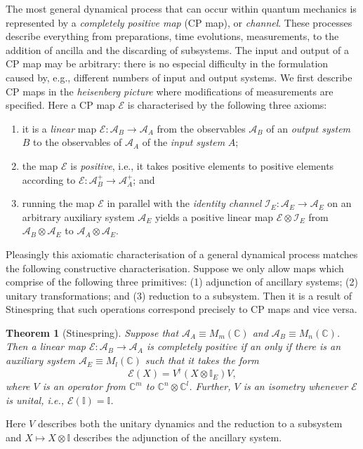 \documentclass[11pt]{amsart}
\theoremstyle{plain}%
\newtheorem{theorem}{Theorem}[section]
\theoremstyle{definition}
\theoremstyle{remark}
\begin{document}
The most general dynamical process that can occur within quantum mechanics is represented by a \emph{completely positive map} (CP map), or \emph{channel}. These processes describe everything from preparations, time evolutions, measurements, to the addition of ancilla and the discarding of subsystems. The input and output of a CP map may be arbitrary: there is no especial difficulty in the formulation caused by, e.g., different numbers of input and output systems. We first describe CP maps in the \emph{heisenberg picture} where modifications of measurements are specified. Here a CP map $\mathcal{E}$ is characterised by the following three axioms: 
\begin{enumerate}
	\item it is a \emph{linear} map $\mathcal{E}:\mathcal{A}_B\rightarrow \mathcal{A}_A$ from the observables $\mathcal{A}_B$ of an \emph{output system} $B$ to the observables of $\mathcal{A}_A$ of the  \emph{input system} $A$;
	\item the map $\mathcal{E}$ is \emph{positive}, i.e., it takes positive elements to positive elements according to $\mathcal{E}:\mathcal{A}_B^+\rightarrow \mathcal{A}_A^+$; and 
	\item running the map $\mathcal{E}$ in parallel with the \emph{identity channel} $\mathcal{I}_E : \mathcal{A}_E\rightarrow \mathcal{A}_E$ on an arbitrary auxiliary system $\mathcal{A}_E$ yields a positive linear map $\mathcal{E}\otimes \mathcal{I}_E$ from $\mathcal{A}_B\otimes \mathcal{A}_E$ to $\mathcal{A}_A\otimes \mathcal{A}_E$.
\end{enumerate} 
Pleasingly this axiomatic characterisation of a general dynamical process matches the following constructive characterisation. Suppose we only allow maps which comprise of the following three primitives: (1) adjunction of  ancillary systems; (2) unitary transformations; and (3) reduction to a subsystem. Then it is a result of Stinespring that such operations correspond precisely to CP maps and vice versa. 
\begin{theorem}[Stinespring] Suppose that $\mathcal{A}_A \equiv M_m(\mathbb{C})$ and $\mathcal{A}_B \equiv M_n(\mathbb{C})$. Then a linear map $\mathcal{E}:\mathcal{A}_B\rightarrow \mathcal{A}_A$ is completely positive if an only if there is an auxiliary system $\mathcal{A}_E \equiv M_l(\mathbb{C})$ such that it takes the form
\begin{equation}
	\mathcal{E}(X) = V^\dag (X\otimes \mathbb{I}_E) V,
\end{equation}
where $V$ is an operator from $\mathbb{C}^m$ to $\mathbb{C}^n\otimes\mathbb{C}^l$. Further, $V$ is an isometry whenever $\mathcal{E}$ is \emph{unital}, i.e., $\mathcal{E}(\mathbb{I}) = \mathbb{I}$. 
\end{theorem}
Here $V$ describes both the unitary dynamics and the reduction to a subsystem and $X\mapsto X\otimes \mathbb{I}$ describes the adjunction of the ancillary system. 
\end{document}
